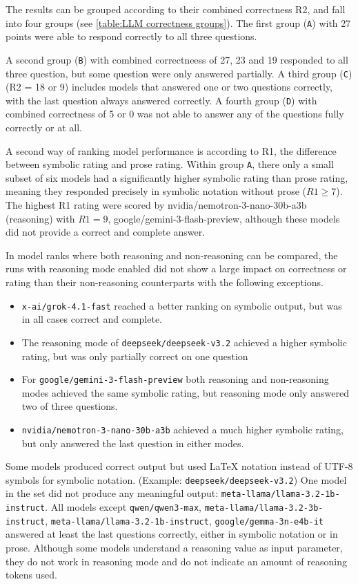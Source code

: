 
The results can be grouped according to their combined correctness R2, and fall into four groups (see \autoref{table:LLM correctness groups}). 
The first group (\texttt{A}) with 27 points were able to respond correctly to all three questions. 

\medskip 

A second group (\texttt{B}) with combined correctneess of 27, 23 and 19 responded to all three question, but some question were only
answered partially. A third group (\texttt{C}) (R2 = 18 or 9) includes models that answered one or two questions correctly, with the last question always answered correctly.
A fourth group (\texttt{D}) with combined correctness of 5 or 0 was not able to answer any of the questions
fully correctly or at all.

\medskip 
A second way of ranking model performance is according to R1, the difference between symbolic rating and prose rating.
Within group \texttt{A}, there only a small subset of six models had a significantly higher symbolic rating than prose rating, meaning they responded precisely in symbolic notation
without prose ($R1 \geq 7$). The highest R1 rating were scored by nvidia/nemotron-3-nano-30b-a3b (reasoning) with $R1 = 9$, 
google/gemini-3-flash-preview, although these models did not provide a correct and complete answer. 

\medskip 

In model ranks where both reasoning and non-reasoning can be compared, the runs with reasoning mode enabled did not show
a large impact on correctness or rating than their non-reasoning counterparts with the following exceptions.
\begin{itemize}
\item \texttt{x-ai/grok-4.1-fast} reached a better ranking on symbolic output, but was in all cases correct and complete.
\item The reasoning mode of \texttt{deepseek/deepseek-v3.2} achieved a higher symbolic rating, but was only partially correct on one question
\item For \texttt{google/gemini-3-flash-preview} both reasoning and non-reasoning modes achieved the same symbolic rating, but reasoning mode only answered two of three questions.
\item \texttt{nvidia/nemotron-3-nano-30b-a3b} achieved a much higher symbolic rating, but only answered the last question in either modes.
\end{itemize}

Some models produced correct output but used \LaTeX{} notation instead of UTF-8 symbols for symbolic notation. (Example: \texttt{deepseek/deepseek-v3.2})
One model in the set did not produce any meaningful output: \texttt{meta-llama/llama-3.2-1b-instruct}.
All models except \texttt{qwen/qwen3-max}, \texttt{meta-llama/llama-3.2-3b-instruct}, \texttt{meta-llama/llama-3.2-1b-instruct}, \texttt{google/gemma-3n-e4b-it} 
answered at least the last questions correctly, either in symbolic notation or in prose.
Although some models understand a reasoning value as input parameter, they do not work in reasoning mode and do not indicate an amount of reasoning tokens used.

